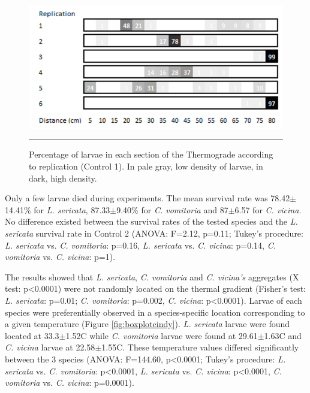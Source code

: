 \begin{figure}[ht]
\centering
		\includegraphics[width=0.9 \textwidth]{Figures/percentcindy.png}
		\rule{35em}{0.5pt}
		\caption[PercentCindy]{Percentage of larvae in each section of the Thermograde according to replication (Control 1). In pale gray, low density of larvae, in dark, high density.}
	\label{fig:percentcindy}
\end{figure}    

Only a few larvae died during experiments. The mean survival rate was 78.42$\pm$14.41$\%$ for \textit{L. sericata}, 87.33$\pm$9.40$\%$ for \textit{C. vomitoria} and 87$\pm$6.57 for \textit{C. vicina}. No difference existed between the survival rates of the tested species and the \textit{L. sericata} survival rate in Control 2 (ANOVA: F=2.12, p=0.11; Tukey’s procedure: \textit{L. sericata} vs. \textit{C. vomitoria}: p=0.16, \textit{L. sericata} vs. \textit{C. vicina}: p=0.14, \textit{C. vomitoria} vs. \textit{C. vicina}: p=1).

The results showed that \textit{L. sericata}, \textit{C. vomitoria} and \textit{C. vicina’s} aggregates (X test: p<0.0001) were not randomly located on the thermal gradient (Fisher’s test: \textit{L. sericata}: p=0.01; \textit{C. vomitoria}: p=0.002, \textit{C. vicina}: p<0.0001). Larvae of each species were preferentially observed in a species-specific location corresponding to a given temperature (Figure \ref{fig:boxplotcindy}). \textit{L. sericata} larvae were found located at 33.3$\pm$1.52C while \textit{C. vomitoria} larvae were found at 29.61$\pm$1.63C and \textit{C. vicina} larvae at 22.58$\pm$1.55C. These temperature values differed significantly between the 3 species (ANOVA: F=144.60, p<0.0001; Tukey’s procedure: \textit{L. sericata} vs. \textit{C. vomitoria}: p<0.0001, \textit{L. sericata} vs. \textit{C. vicina}: p<0.0001, \textit{C. vomitoria} vs. \textit{C. vicina}: p=0.0001). 


